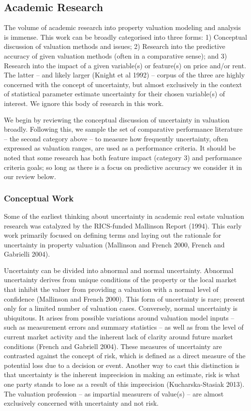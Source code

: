 \documentclass[colTwo]{anon}
\theoremstyle{definition}
\begin{document}
\subsection{Academic Research}

The volume of academic research into property valuation modeling and analysis is immense.  This work can be broadly categorised into three forms: 1) Conceptual discussion of valuation methods and issues; 2) Research into the predictive accuracy of given valuation methods (often in a comparative sense); and  3) Research into the impact of a given variable(s) or feature(s) on price and/or rent.  The latter -- and likely larger (Knight et al 1992) -- corpus of the three are highly concerned with the concept of uncertainty, but almost exclusively in the context of statistical parameter estimate uncertainty for their chosen variable(s) of interest. We ignore this body of research in this work. 

We begin by reviewing the conceptual discussion of uncertainty in valuation broadly.  Following this, we sample the set of comparative performance literature -- the second category above -- to measure how frequently uncertainty, often expressed as valuation ranges, are used as a performance criteria. It should be noted that some research has both feature impact (category 3) and performance criteria goals; so long as there is a focus on predictive accuracy we consider it in our review below. 

\subsubsection{Conceptual Work}

Some of the earliest thinking about uncertainty in academic real estate valuation research was catalyzed by the RICS-funded Mallinson Report (1994).  This early work primarily focused on defining terms and laying out the rationale for uncertainty in property valuation (Mallinson and French 2000, French and Gabrielli 2004).

Uncertainty can be divided into abnormal and normal uncertainty.  Abnormal uncertainty derives from unique conditions of the property or the local market that inhibit the valuer from providing a valuation with a normal level of confidence (Mallinson and French 2000).  This form of uncertainty is rare; present only for a limited number of valuation cases.  Conversely, normal uncertainty is ubiquitous.  It arises from possible variations around valuation model inputs -- such as measurement errors and summary statistics -- as well as from the level of current market activity and the inherent lack of clarity around future market conditions (French and Gabriell 2004). These measures of uncertainty are contrasted against the concept of risk, which is defined as a direct measure of the potential loss due to a decision or event.  Another way to cast this distinction is that uncertainty is the inherent imprecision in making an estimate, risk is what one party stands to lose as a result of this imprecision (Kucharska-Stasiak 2013).  The valuation profession -- as impartial measurers of value(s) -- are almost exclusively concerned with uncertainty and not risk.
\end{document}
